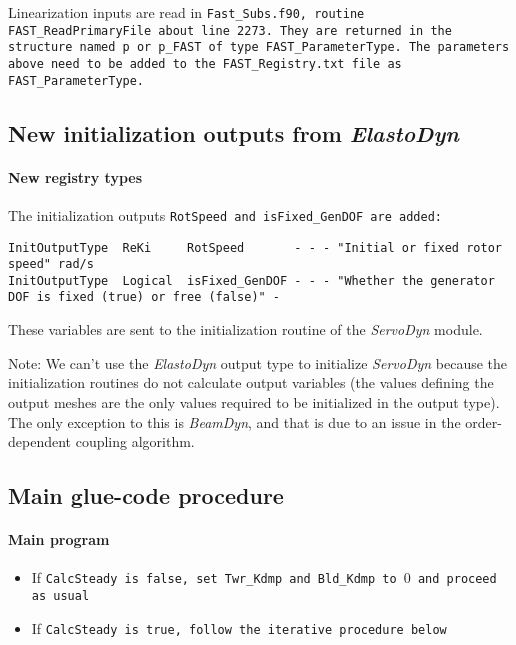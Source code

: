 \documentclass[11pt]{article}
\newcommand{\question}[1]{{\color{red}{#1}}}
\begin{document}
\question{Do we want to adjust more damping values?}
Linearization inputs are read in \tt{Fast\_Subs.f90}, routine \tt{FAST\_ReadPrimaryFile} about line 2273. They are returned in the structure named \tt{p} or \tt{p\_FAST} of type \tt{FAST\_ParameterType}. The parameters above need to be added to the \tt{FAST\_Registry.txt} file as \tt{FAST\_ParameterType}.





\subsection{New initialization outputs from \textit{ElastoDyn}}
\label{sec:newEDinitoutputs}

\paragraph{New registry types}
The initialization outputs \tt{RotSpeed} and \tt{isFixed\_GenDOF} are added: 
\fortran
\begin{lstlisting}
InitOutputType  ReKi     RotSpeed       - - - "Initial or fixed rotor speed" rad/s
InitOutputType  Logical  isFixed_GenDOF - - - "Whether the generator DOF is fixed (true) or free (false)" -
\end{lstlisting}

These variables are sent to the initialization routine of the \textit{ServoDyn} module.

Note: We can't use the \textit{ElastoDyn} output type to initialize \textit{ServoDyn} because the 
initialization routines do not calculate output variables (the values defining the output meshes are the only
values required to be initialized in the output type). The only exception to this is \textit{BeamDyn}, and 
that is due to an issue in the order-dependent coupling algorithm.


\subsection{Main glue-code procedure}
\label{sec:gluecodeiterative}


\paragraph{Main program}
\begin{itemize}\tightlist
    \item If \tt{CalcSteady} is false, set \tt{Twr\_Kdmp} and \tt{Bld\_Kdmp} to $0$ and proceed as usual
    \item If \tt{CalcSteady} is true, follow the iterative procedure below
\end{itemize}
\end{document}
